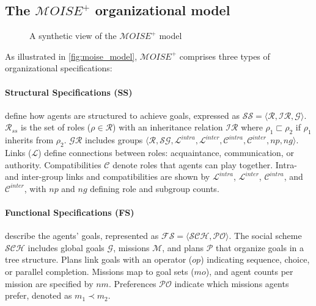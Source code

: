 \documentclass[pdflatex,sn-mathphys-num]{sn-jnl}%
\theoremstyle{thmstyleone}%
\theoremstyle{thmstyletwo}%
\theoremstyle{thmstylethree}%
\begin{document}

\subsection{The $\mathcal{M}OISE^+$ organizational model}

\begin{figure}[h!]
    \centering
    
    \caption{A synthetic view of the $\mathcal{M}OISE^+$ model}
    \label{fig:moise_model}
\end{figure}

As illustrated in \autoref{fig:moise_model}, $\mathcal{M}OISE^+$ comprises three types of organizational specifications:

\noindent \paragraph{\textbf{Structural Specifications (SS)}} define how agents are structured to achieve goals, expressed as $\mathcal{SS} = \langle \mathcal{R}, \mathcal{IR}, \mathcal{G} \rangle$. $\mathcal{R}_{ss}$ is the set of roles ($\rho \in \mathcal{R}$) with an inheritance relation $\mathcal{IR}$ where $\rho_1 \sqsubset \rho_2$ if $\rho_1$ inherits from $\rho_2$. $\mathcal{GR}$ includes groups $\langle \mathcal{R}, \mathcal{SG}, \mathcal{L}^{intra}, \mathcal{L}^{inter}, \allowbreak \mathcal{C}^{intra}, \mathcal{C}^{inter}, np, ng \rangle$. Links ($\mathcal{L}$) define connections between roles: acquaintance, communication, or authority. Compatibilities $\mathcal{C}$ denote roles that agents can play together. Intra- and inter-group links and compatibilities are shown by $\mathcal{L}^{intra}$, $\mathcal{L}^{inter}$, $\mathcal{C}^{intra}$, and $\mathcal{C}^{inter}$, with $np$ and $ng$ defining role and subgroup counts.

\noindent \paragraph{\textbf{Functional Specifications (FS)}} describe the agents' goals, represented as $\mathcal{FS} = \langle \mathcal{SCH}, \mathcal{PO} \rangle$. The social scheme $\mathcal{SCH}$ includes global goals $\mathcal{G}$, missions $\mathcal{M}$, and plans $\mathcal{P}$ that organize goals in a tree structure. Plans link goals with an operator ($op$) indicating sequence, choice, or parallel completion. Missions map to goal sets ($mo$), and agent counts per mission are specified by $nm$. Preferences $\mathcal{PO}$ indicate which missions agents prefer, denoted as $m_1 \prec m_2$.
\end{document}
